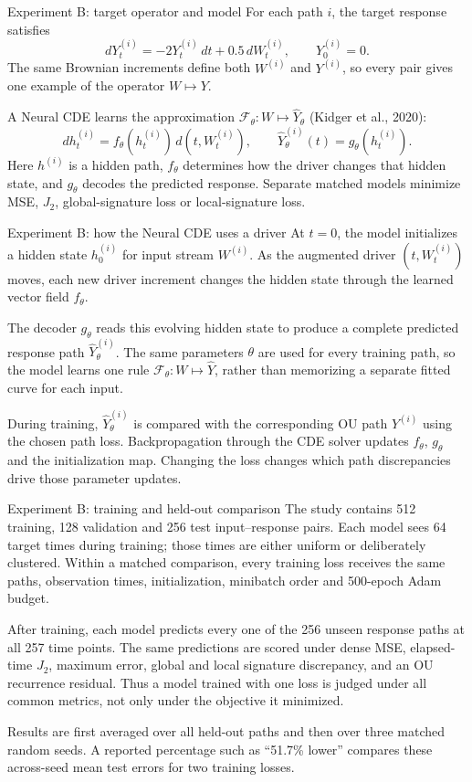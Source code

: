 \documentclass[aspectratio=169,9pt]{beamer}
\newcommand{\Jtwo}{J_2}
\begin{document}
\begin{frame}{Experiment B: target operator and model}
  For each path $i$, the target response satisfies
  \[
    dY_t^{(i)}=-2Y_t^{(i)}\,dt+0.5\,dW_t^{(i)},
    \qquad Y_0^{(i)}=0.
  \]
  The same Brownian increments define both $W^{(i)}$ and $Y^{(i)}$, so every pair gives one example of the operator $W\mapsto Y$.

  A Neural CDE learns the approximation $\mathcal F_\theta:W\mapsto\widehat Y_\theta$ (Kidger et al., 2020):
  \[
    dh_t^{(i)}=f_\theta(h_t^{(i)})\,d(t,W_t^{(i)}),
    \qquad
    \widehat Y_\theta^{(i)}(t)=g_\theta(h_t^{(i)}).
  \]
  Here $h^{(i)}$ is a hidden path, $f_\theta$ determines how the driver changes that hidden state, and $g_\theta$ decodes the predicted response. Separate matched models minimize MSE, $\Jtwo$, global-signature loss or local-signature loss.
\end{frame}

\begin{frame}{Experiment B: how the Neural CDE uses a driver}
  At $t=0$, the model initializes a hidden state $h_0^{(i)}$ for input stream $W^{(i)}$. As the augmented driver $(t,W_t^{(i)})$ moves, each new driver increment changes the hidden state through the learned vector field $f_\theta$.

  The decoder $g_\theta$ reads this evolving hidden state to produce a complete predicted response path $\widehat Y_\theta^{(i)}$. The same parameters $\theta$ are used for every training path, so the model learns one rule $\mathcal F_\theta:W\mapsto\widehat Y$, rather than memorizing a separate fitted curve for each input.

  During training, $\widehat Y_\theta^{(i)}$ is compared with the corresponding OU path $Y^{(i)}$ using the chosen path loss. Backpropagation through the CDE solver updates $f_\theta$, $g_\theta$ and the initialization map. Changing the loss changes which path discrepancies drive those parameter updates.
\end{frame}

\begin{frame}{Experiment B: training and held-out comparison}
  The study contains 512 training, 128 validation and 256 test input--response pairs. Each model sees 64 target times during training; those times are either uniform or deliberately clustered. Within a matched comparison, every training loss receives the same paths, observation times, initialization, minibatch order and 500-epoch Adam budget.

  After training, each model predicts every one of the 256 unseen response paths at all 257 time points. The same predictions are scored under dense MSE, elapsed-time $\Jtwo$, maximum error, global and local signature discrepancy, and an OU recurrence residual. Thus a model trained with one loss is judged under all common metrics, not only under the objective it minimized.

  Results are first averaged over all held-out paths and then over three matched random seeds. A reported percentage such as ``51.7\% lower'' compares these across-seed mean test errors for two training losses.
\end{frame}
\end{document}
